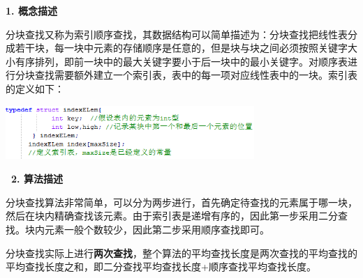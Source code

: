 {\textbf{1. 概念描述}}

{{分块查找又称为索引顺序查找}，其数据结构可以简单描述为：分块查找把线性表分成若干块，{每一块中元素的存储顺序是任意的，但是块与块之间必须按照关键字大小有序排列}，即前一块中的最大关键字要小于后一块中的最小关键字。对顺序表进行分块查找需要额外建立一个索引表，表中的每一项对应线性表中的一块。}{索引表的定义如下：}

\includegraphics[width=3.70833in,height=0.80208in]{png-jpeg-pics/7B6353AA0580E0C833864C13ECA0965F.png}

{\textbf{~2. 算法描述}}

{分块查找算法非常简单，可以分为两步进行，{首先确定待查找的元素属于哪一块，然后在块内精确查找该元素}。由于索引表是递增有序的，因此第一步采用二分查找。块内元素一般个数较少，因此第二步采用顺序查找即可。}

分块查找实际上进行{\textbf{两次查找}}，{整个算法的平均查找长度是两次查找的平均查找的平均查找长度之和}，即二分查找平均查找长度+顺序查找平均查找长度。

~ ~ ~ ~
